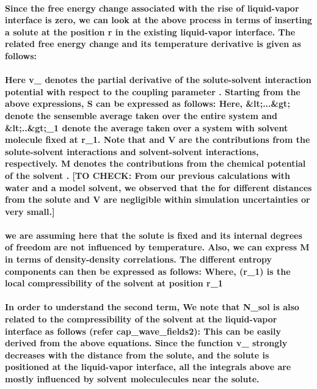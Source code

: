 \documentclass[a4paper,12pt,single,pdftex]{scrartcl}
\begin{document}
\label{ID_1074911865}\paragraph{Since the free energy change associated with the rise of liquid-vapor interface is zero, we can look at the above process in terms of inserting a solute at the position r in the existing liquid-vapor interface. The related free energy change and its temperature derivative is given as follows:}

\label{ID_388366021}\paragraph{Here v_{\Psi} denotes the partial derivative of the solute-solvent interaction potential with respect to the coupling parameter \lambda. Starting from the above expressions, \delta S can be expressed as follows: Here, &lt;...&gt; denote the sensemble average taken over the entire system and &lt;..&gt;_1 denote the average taken over a system with solvent molecule fixed at r_1.  Note that \Phi and V are the contributions from the solute-solvent interactions and solvent-solvent interactions, respectively. M denotes the contributions from the chemical potential of the solvent . [TO CHECK: From our previous calculations with water and a model solvent, we observed that the for different distances from the solute \Phi and V are negligible within simulation uncertainties or very small.]}

\label{ID_349834534}\paragraph{we are assuming here that the solute is fixed and its internal degrees of freedom are not influenced by temperature. Also, we can express M in terms of density-density correlations. The different entropy components can then be expressed as follows: Where, \chi (r_1) is the local compressibility of the solvent at position r_1}

\label{ID_1103070320}\paragraph{In order to understand the second term, We note that \Delta N_{sol} is also related to the compressibility of the solvent at the liquid-vapor interface as follows (refer cap_wave_fields2):  This can be easily derived from the above equations. Since the function v_{\Psi} strongly decreases with the distance from the solute, and the solute is positioned at the liquid-vapor interface, all the integrals above are mostly influenced by solvent moleculecules near the solute.}
\end{document}
